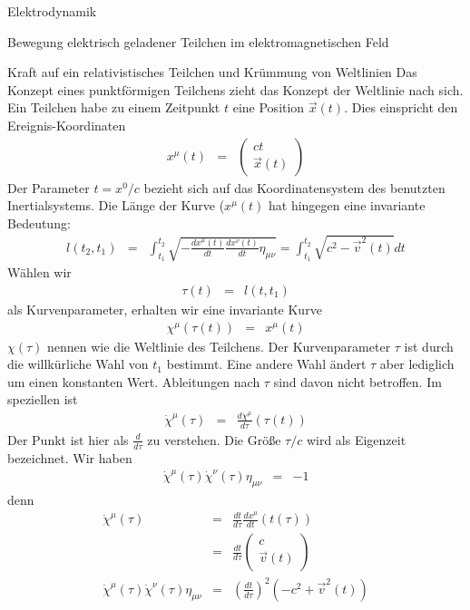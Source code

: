 \begin{chapter}{\titlestr}
\begin{section}{Elektrodynamik}
\begin{subsection}{Bewegung elektrisch geladener Teilchen im elektromagnetischen Feld}
\begin{subsubsection}{Kraft auf ein relativistisches Teilchen und Krümmung von Weltlinien}
Das Konzept eines punktförmigen Teilchens zieht das Konzept der Weltlinie nach sich. Ein Teilchen habe
zu einem Zeitpunkt $t$ eine Position $\vec{x}(t)$. Dies einspricht den Ereignis-Koordinaten
\begin{eqnarray*}
x^\mu(t) &=&
\begin{pmatrix}
ct\\
\vec{x}(t)
\end{pmatrix}
\end{eqnarray*}
Der Parameter $t=x^0/c$ bezieht sich auf das Koordinatensystem des benutzten Inertialsystems. Die Länge der Kurve ($x^\mu(t)$
hat hingegen eine invariante Bedeutung:
\begin{eqnarray*}
l(t_2, t_1) &=& \int_{t_1}^{t_2} \sqrt{-\frac{dx^\mu(t)}{dt}\frac{dx^\nu(t)}{dt}\eta_{\mu\nu}}
=\int_{t_1}^{t_2} \sqrt{c^2-\vec{v}^2(t)}dt
\end{eqnarray*}
Wählen wir
\begin{eqnarray*}
\tau(t) &=& l(t, t_1) 
\end{eqnarray*}
als Kurvenparameter, erhalten wir eine invariante Kurve
\begin{eqnarray*}
\chi^\mu(\tau(t)) &=& x^\mu(t)
\end{eqnarray*}
$\chi(\tau)$ nennen wie die Weltlinie des Teilchens. Der Kurvenparameter $\tau$ ist durch die willkürliche Wahl von $t_1$ bestimmt. 
Eine andere Wahl ändert $\tau$ aber lediglich um einen konstanten Wert. Ableitungen nach $\tau$ sind davon nicht betroffen.
Im speziellen ist
\begin{eqnarray*}
\dot{\chi}^\mu(\tau) &=& \frac{d\chi^\mu}{d\tau}(\tau(t))
\end{eqnarray*}
Der Punkt ist hier als $\frac{d}{d\tau}$ zu verstehen. Die Größe $\tau/c$ wird als Eigenzeit bezeichnet. Wir haben
\begin{eqnarray*}
\dot{\chi}^\mu(\tau)\dot{\chi}^\nu(\tau)\eta_{\mu\nu} &=& -1
\end{eqnarray*}
denn
\begin{eqnarray*}
\dot{\chi}^\mu(\tau) &=& \frac{dt}{d\tau}\frac{dx^\mu}{dt}(t(\tau))\\
&=& \frac{dt}{d\tau}\begin{pmatrix}
c\\
\vec{v}(t)
\end{pmatrix}\\
\dot{\chi}^\mu(\tau)\dot{\chi}^\nu(\tau)\eta_{\mu\nu} &=& \left(\frac{dt}{d\tau}\right)^2\left(-c^2+\vec{v}^2(t)\right)\\

\end{eqnarray*}
\end{subsubsection}
\end{subsection}
\end{section}
\end{chapter}
